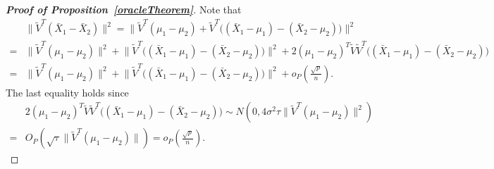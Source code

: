 \documentclass[review]{elsarticle}
\theoremstyle{plain}
\theoremstyle{definition}
\theoremstyle{remark}
\begin{document}
\begin{proof}[\textbf{Proof of Proposition~\ref{oracleTheorem}}]
Note that
    \begin{equation}\label{qiguaile}
        \begin{aligned}
            &\|\tilde{V}^T(\bar{X}_1-\bar{X}_2)\|^2
            =\big\|\tilde{V}^T(\mu_1-\mu_2)+\tilde{V}^T\big((\bar{X}_1-\mu_1)-(\bar{X}_2-\mu_2)\big)\big\|^2\\
            =&\|\tilde{V}^T(\mu_1-\mu_2)\|^2+
            \big\|\tilde{V}^T\big((\bar{X}_1-\mu_1)-(\bar{X}_2-\mu_2)\big)\big\|^2+
            2{(\mu_1-\mu_2)}^T\tilde{V}\tilde{V}^T\big((\bar{X}_1-\mu_1)-(\bar{X}_2-\mu_2)\big)\\
            =&\|\tilde{V}^T(\mu_1-\mu_2)\|^2+
            \big\|\tilde{V}^T\big((\bar{X}_1-\mu_1)-(\bar{X}_2-\mu_2)\big)\big\|^2+
            o_P(\frac{\sqrt{p}}{n}).
        \end{aligned}
    \end{equation}
    The last equality holds since
    \begin{equation*}
        \begin{aligned}
            &2{(\mu_1-\mu_2)}^T\tilde{V}\tilde{V}^T\big((\bar{X}_1-\mu_1)-(\bar{X}_2-\mu_2)\big)\sim N(0,4\sigma^2 \tau \|\tilde{V}^T(\mu_1-\mu_2)\|^2)\\
            =& O_P(\sqrt{\tau}\|\tilde{V}^T(\mu_1-\mu_2)\| )=o_P(\frac{\sqrt{p}}{n}).
        \end{aligned}
    \end{equation*}


\end{proof}
\end{document}
